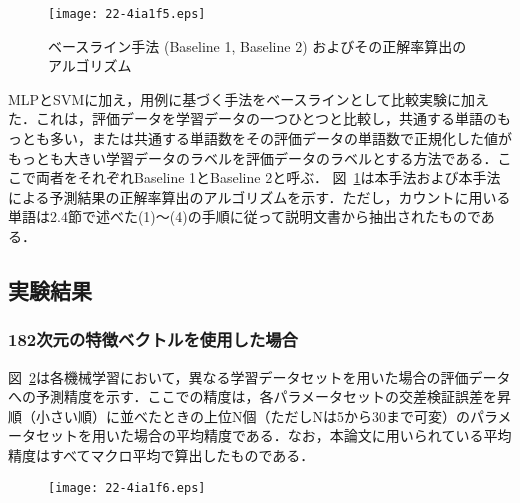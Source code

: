 \documentclass[japanese]{jnlp_1.4}
\begin{document}
\begin{figure}[b]
\begin{center}
\texttt{[image: 22-4ia1f5.eps]}
\end{center}
\caption{ベースライン手法 (Baseline 1, Baseline 2) およびその正解率算出のアルゴリズム}
\label{fig:baseline}
\end{figure}

MLPとSVMに加え，用例に基づく手法をベースラインとして比較実験に加えた．これは，評価データを学習データの一つひとつと比較し，共通する単語のもっとも多い，または共通する単語数をその評価データの単語数で正規化した値がもっとも大きい学習データのラベルを評価データのラベルとする方法である．ここで両者をそれぞれBaseline 1とBaseline 2と呼ぶ．
図~\ref{fig:baseline}は本手法および本手法による予測結果の正解率算出のアルゴリズムを示す．ただし，カウントに用いる単語は2.4節で述べた(1)〜(4)の手順に従って説明文書から抽出されたものである．


\subsection{実験結果}

\subsubsection{182次元の特徴ベクトルを使用した場合}

図~\ref{fig:prec}は各機械学習において，異なる学習データセットを用いた場合の評価データへの予測精度を示す．ここでの精度は，各パラメータセットの交差検証誤差を昇順（小さい順）に並べたときの上位N個（ただしNは5から30まで可変）のパラメータセットを用いた場合の平均精度である．なお，本論文に用いられている平均精度はすべてマクロ平均で算出したものである．

\begin{figure}[p]
\begin{center}
\texttt{[image: 22-4ia1f6.eps]}
\end{center}
\label{fig:prec}\end{figure}
\end{document}
